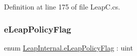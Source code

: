 Definition at line 175 of file Leap\+C.\+cs.

\mbox{\label{namespace_leap_internal_abf43a1780899ea756a686f838b7117be}} 
\subsubsection{\texorpdfstring{eLeapPolicyFlag}{eLeapPolicyFlag}}
{\footnotesize\ttfamily enum \mbox{\hyperlink{namespace_leap_internal_abf43a1780899ea756a686f838b7117be}{Leap\+Internal.\+e\+Leap\+Policy\+Flag}} \+: uint\hspace{0.3cm}{\ttfamily [strong]}}

